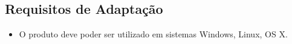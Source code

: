 \subsection{Requisitos de Adaptação}
\begin{itemize}
\item O produto deve poder ser utilizado em sistemas Windows, Linux, OS X.
\end{itemize}
